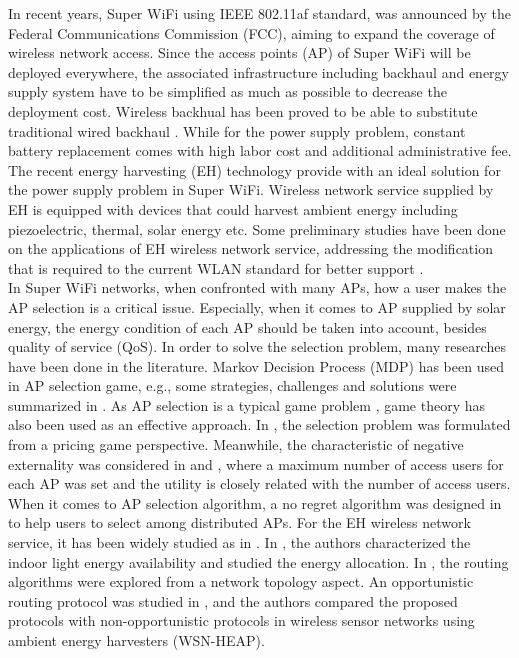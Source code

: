 \documentclass[conference]{IEEEtran}
\begin{document}
In recent years, Super WiFi using IEEE 802.11af standard, was announced by the Federal Communications Commission (FCC), aiming to expand the coverage of wireless network access. Since the access points (AP) of Super WiFi will be deployed everywhere, the associated infrastructure including backhaul and energy supply system have to be simplified as much as possible to decrease the deployment cost. Wireless backhual has been proved to be able to substitute traditional wired backhaul \cite{30}. While for the power supply problem, constant battery replacement comes with high labor cost and additional administrative fee. The recent energy harvesting (EH) technology provide with an ideal solution for the power supply problem in Super WiFi. Wireless network service supplied by EH is equipped with devices that could harvest ambient energy including piezoelectric, thermal, solar energy etc. Some preliminary studies have been done on the applications of EH wireless network service, addressing the modification that is required to the current WLAN standard for better support \cite{27}. \\
\indent In Super WiFi networks, when confronted with many APs, how a user makes the AP selection is a critical issue. Especially, when it comes to AP supplied by solar energy, the energy condition of each AP should be taken into account, besides quality of service (QoS). In order to solve the selection problem, many researches have been done in the literature. Markov Decision Process (MDP) has been used in AP selection game, e.g., some strategies, challenges and solutions were summarized in \cite{23}. As AP selection is a typical game problem \cite{22}, game theory has also been used as an effective approach. In \cite{7}, the selection problem was formulated from a pricing game perspective. Meanwhile, the characteristic of negative externality was considered in \cite{5} and \cite{21}, where a maximum number of access users for each AP was set and the utility is closely related with the number of access users. When it comes to AP selection algorithm, a no regret algorithm was designed in \cite{11} to help users to select among distributed APs. For the EH wireless network service, it has been widely studied as in \cite{17,18,19}. In \cite{17}, the authors characterized the indoor light energy availability and studied the energy allocation. In \cite{18}, the routing algorithms were explored from a network topology aspect. An opportunistic routing protocol was studied in \cite{19}, and the authors compared the proposed protocols with non-opportunistic protocols in wireless sensor networks using ambient energy harvesters (WSN-HEAP).\\
\end{document}
